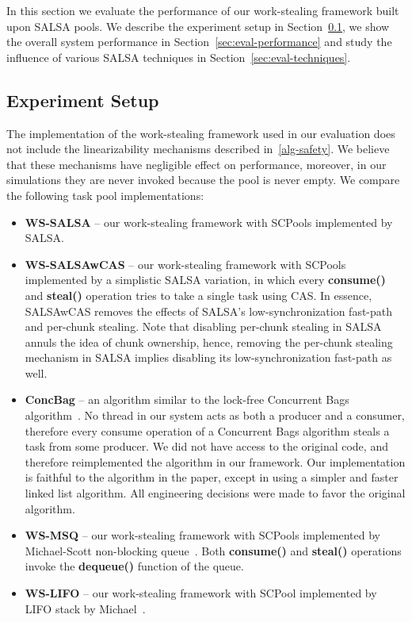 In this section we evaluate the performance of our work-stealing framework built upon SALSA pools. 
We describe the experiment setup in Section~\ref{sec:exp-setup}, we show the overall system performance in Section~\ref{sec:eval-performance} and study the influence of various SALSA techniques in Section~\ref{sec:eval-techniques}.

\subsection {Experiment Setup}
\label{sec:exp-setup}
The implementation of the work-stealing framework used in our evaluation does not include the linearizability mechanisms described in~\ref{alg-safety}. We believe that these mechanisms have negligible effect on performance, moreover, in our simulations they are never invoked because the pool is never empty. We compare the following task pool implementations:
\begin {itemize}
\item
{\bf WS-SALSA} -- our work-stealing framework with SCPools implemented by SALSA.
\item
{\bf WS-SALSAwCAS} -- our work-stealing framework with SCPools implemented by a simplistic SALSA variation, in which every {\bf consume()} and {\bf steal()} operation tries to take a single task using CAS. In essence, SALSAwCAS removes the effects of SALSA's low-synchronization fast-path and per-chunk stealing. 
Note that disabling per-chunk stealing in SALSA annuls the idea of chunk ownership, hence, removing the per-chunk stealing mechanism in SALSA implies disabling its low-synchronization fast-path as well. 
\item
{\bf ConcBag} -- an algorithm similar to the lock-free Concurrent Bags algorithm~\cite{Sundell:2011:LAC:1989493.1989550}. 
No thread in our system acts as both a producer and a consumer, therefore every consume operation of a Concurrent Bags algorithm steals a task from some producer.
We did not have access to the original code, and therefore reimplemented the algorithm in our framework. Our implementation is faithful to the algorithm in the paper, except in using a simpler and faster linked list algorithm. All engineering decisions were made to favor the original algorithm. 
\item
{\bf WS-MSQ} -- our work-stealing framework with SCPools implemented by Michael-Scott non-blocking queue~\cite{Michael:1996:SFP:248052.248106}. Both {\bf consume()} and {\bf steal()} operations invoke the {\bf dequeue()} function of the queue. 
\item
{\bf WS-LIFO} -- our work-stealing framework with SCPool implemented by LIFO stack by Michael~\cite{Michael:2004:HPS:987524.987595}. 
\end {itemize} 


